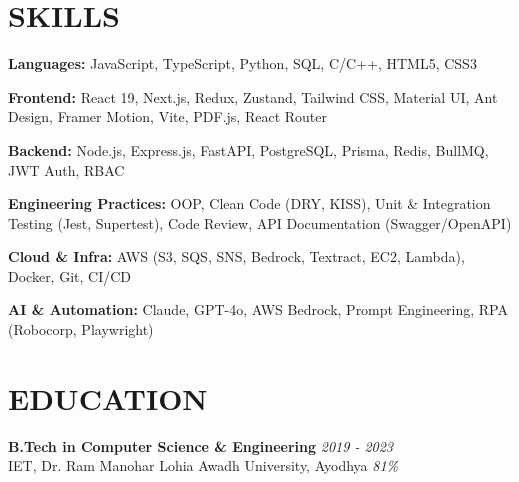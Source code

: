 \documentclass[a4paper,10pt]{article}
\begin{document}
\vspace{3pt}

\section{SKILLS}

\textbf{Languages:} JavaScript, TypeScript, Python, SQL, C/C++, HTML5, CSS3

\textbf{Frontend:} React 19, Next.js, Redux, Zustand, Tailwind CSS, Material UI, Ant Design, Framer Motion, Vite, PDF.js, React Router

\textbf{Backend:} Node.js, Express.js, FastAPI, PostgreSQL, Prisma, Redis, BullMQ, JWT Auth, RBAC

\textbf{Engineering Practices:} OOP, Clean Code (DRY, KISS), Unit \& Integration Testing (Jest, Supertest), Code Review, API Documentation (Swagger/OpenAPI)

\textbf{Cloud \& Infra:} AWS (S3, SQS, SNS, Bedrock, Textract, EC2, Lambda), Docker, Git, CI/CD

\textbf{AI \& Automation:} Claude, GPT-4o, AWS Bedrock, Prompt Engineering, RPA (Robocorp, Playwright)

\vspace{3pt}

\section{EDUCATION}

\textbf{B.Tech in Computer Science \& Engineering} \hfill \textit{2019 - 2023}\\
IET, Dr. Ram Manohar Lohia Awadh University, Ayodhya \hfill \textit{81\%}
\end{document}
